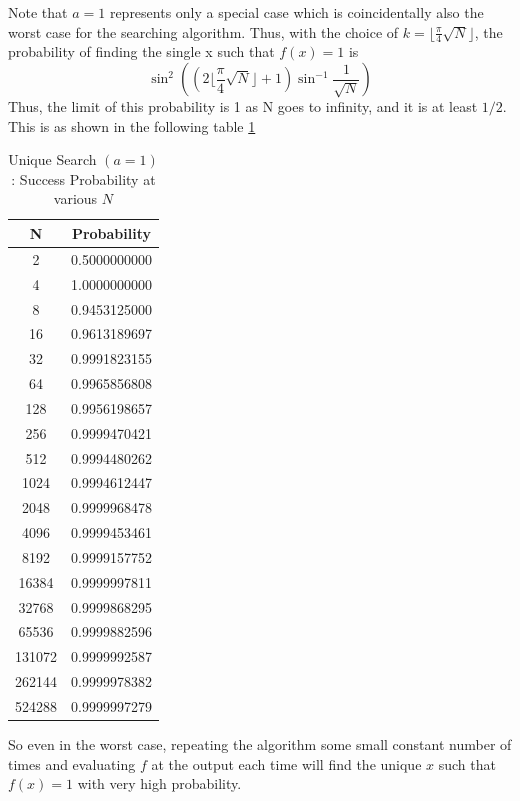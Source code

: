 \documentclass[12pt, oneside]{book}
\theoremstyle{definition}
\theoremstyle{definition}
\theoremstyle{remark}
\begin{document}
Note that $a=1$ represents only a special case which is coincidentally also the worst case for the searching algorithm. Thus, with the choice of $k=\lfloor \frac{\pi}{4}\sqrt{N} \rfloor$, the probability of finding the single x such that $f(x)=1$ is
\[
\sin^2 \left(\left(2\lfloor \frac{\pi}{4}\sqrt{N} \rfloor+1\right)\sin^{-1} \frac{1}{\sqrt{N}}\right)
\]
Thus, the limit of this probability is 1 as N goes to infinity, and it is at least $1/2$. This is as shown in the following table \ref{tab:Probdist}

\begin{table}[H]
    \centering
    \begin{tabular}{c|c}
        N & Probability\\
        \hline
        2	& 0.5000000000 \\
        4	& 1.0000000000 \\
        8	& 0.9453125000 \\
        16	& 0.9613189697 \\
        32	& 0.9991823155 \\
        64	& 0.9965856808 \\
        128	& 0.9956198657 \\
        256	& 0.9999470421 \\
        512	& 0.9994480262 \\
        1024	& 0.9994612447 \\
        2048	& 0.9999968478 \\
        4096	& 0.9999453461 \\
        8192	& 0.9999157752 \\
        16384	& 0.9999997811 \\
        32768	& 0.9999868295 \\
        65536	& 0.9999882596 \\
        131072	& 0.9999992587 \\
        262144	& 0.9999978382 \\
        524288	& 0.9999997279 \\
    \end{tabular}
    \caption{Unique Search $(a=1)$: Success Probability at various $N$}
    \label{tab:Probdist}
\end{table}
So even in the worst case, repeating the algorithm some small constant number of times and evaluating $f$ at the output each time will find the unique $x$ such that $f(x)=1$ with very high probability.
\end{document}

